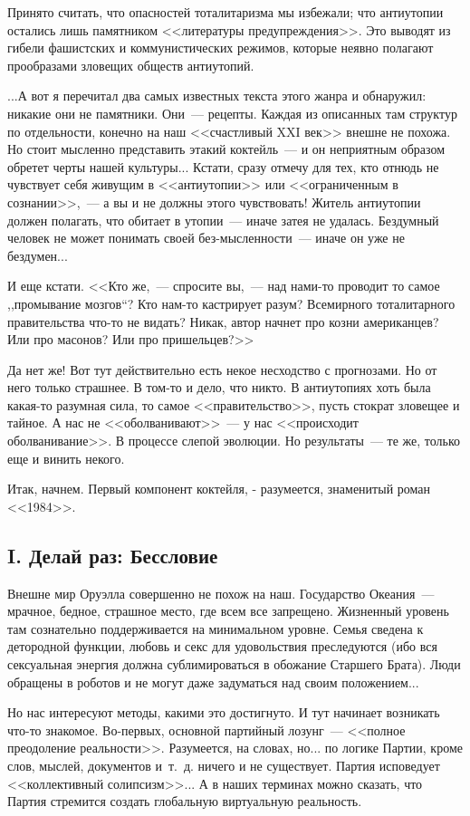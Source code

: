 \documentclass{scrbook}
\newcommand{\glqq}{,,}
\newcommand{\grqq}{``}
\newcommand{\flqq}{<<}
\newcommand{\frqq}{>>}
\newcommand{\mdash}{~--- }
\newcommand{\commamdash}{~--- } %
\newcommand{\essaysection}[1]{\subsection*{#1}\nopagebreak}
\begin{document}
Принято считать, что опасностей тоталитаризма мы избежали; что антиутопии остались лишь памятником {\flqq}литературы предупреждения{\frqq}. Это выводят из гибели фашистских и коммунистических режимов, которые неявно полагают прообразами зловещих обществ антиутопий.

...А вот я перечитал два самых известных текста этого жанра и обнаружил: никакие они не памятники. Они{\mdash}рецепты. Каждая из описанных там структур по отдельности, конечно на наш {\flqq}счастливый XXI век{\frqq} внешне не похожа. Но стоит мысленно представить этакий коктейль{\mdash}и он неприятным образом обретет черты нашей культуры... Кстати, сразу отмечу для тех, кто отнюдь не чувствует себя живущим в {\flqq}антиутопии{\frqq} или {\flqq}ограниченным в сознании{\frqq},{\commamdash}а вы и не должны этого чувствовать! Житель антиутопии должен полагать, что обитает в утопии{\mdash}иначе затея не удалась. Бездумный человек не может понимать своей без-мысленности{\mdash}иначе он уже не бездумен...

И еще кстати. {\flqq}Кто же,{\commamdash}спросите вы,{\commamdash}над нами-то проводит то самое {\glqq}промывание мозгов{\grqq}? Кто нам-то кастрирует разум? Всемирного тоталитарного правительства что-то не видать? Никак, автор начнет про козни американцев? Или про масонов? Или про пришельцев?{\frqq}

Да нет же! Вот тут действительно есть некое несходство с прогнозами. Но от него только страшнее. В том-то и дело, что никто. В антиутопиях хоть была какая-то разумная сила, то самое {\flqq}правительство{\frqq}, пусть стократ зловещее и тайное. А нас не {\flqq}оболванивают{\frqq}{\mdash}у нас {\flqq}происходит оболванивание{\frqq}. В процессе слепой эволюции. Но результаты{\mdash}те же, только еще и винить некого.

Итак, начнем. Первый компонент коктейля, - разумеется, знаменитый роман {\flqq}1984{\frqq}. 
       
\essaysection{I. Делай раз: Бессловие}
       
Внешне мир Оруэлла совершенно не похож на наш. Государство Океания{\mdash}мрачное, бедное, страшное место, где всем все запрещено. Жизненный уровень там сознательно поддерживается на минимальном уровне. Семья сведена к детородной функции, любовь и секс для удовольствия преследуются (ибо вся сексуальная энергия должна сублимироваться в обожание Старшего Брата). Люди обращены в роботов и не могут даже задуматься над своим положением...

Но нас интересуют методы, какими это достигнуто. И тут начинает возникать что-то знакомое. Во-первых, основной партийный лозунг{\mdash}{\flqq}полное преодоление реальности{\frqq}. Разумеется, на словах, но... по логике Партии, кроме слов, мыслей, документов и~т.~д. ничего и не существует. Партия исповедует {\flqq}коллективный солипсизм{\frqq}... А в наших терминах можно сказать, что Партия стремится создать глобальную виртуальную реальность.
\end{document}
